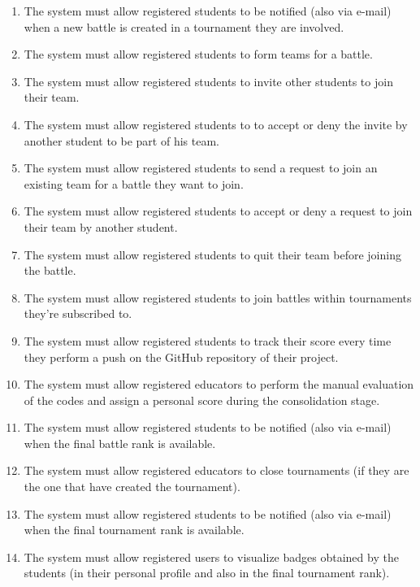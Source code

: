 \documentclass[a4paper, 11pt, titlepage]{article}
\begin{document}
\begin{enumerate}[font={\bfseries}, label={R\arabic* :}]
    \item The system must allow registered students to be notified (also via e-mail) when a new battle is created in a tournament they are involved.
    \item The system must allow registered students to form teams for a battle.
    \item The system must allow registered students to invite other students to join their team. 
    \item The system must allow registered students to to accept or deny the invite by another student to be part of his team.
    \item The system must allow registered students to send a request to join an existing team for a battle they want to join.
    \item The system must allow registered students to accept or deny a request to join their team by another student.
    \item The system must allow registered students to quit their team before joining the battle.
    \item The system must allow registered students to join battles within tournaments they're subscribed to.
    \item The system must allow registered students to track their score every time they perform a push on the GitHub repository of their project.
    \item The system must allow registered educators to perform the manual evaluation of the codes and assign a personal score during the consolidation stage.
    \item The system must allow registered students to be notified (also via e-mail) when the final battle rank is available.
    \item The system must allow registered educators to close tournaments (if they are the one that have created the tournament).
    \item The system must allow registered students to be notified (also via e-mail) when the final tournament rank is available.
    \item The system must allow registered users to visualize badges obtained by the students (in their personal profile and also in the final tournament rank).
\end{enumerate}

\newpage

\end{document}
